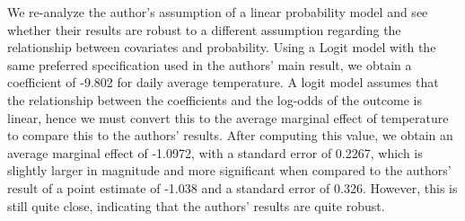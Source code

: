 \documentclass{article}
\begin{document}
	We re-analyze the author's assumption of a linear probability model and see whether their results are robust to a different assumption regarding the relationship between covariates and probability. Using a Logit model with the same preferred specification used in the authors' main result, we obtain a coefficient of -9.802 for daily average temperature. A logit model assumes that the relationship between the coefficients and the log-odds of the outcome is linear, hence we must convert this to the average marginal effect of temperature to compare this to the authors' results. After computing this value, we obtain an average marginal effect of -1.0972, with a standard error of 0.2267, which is slightly larger in magnitude and more significant when compared to the authors' result of a point estimate of -1.038 and a standard error of 0.326. However, this is still quite close, indicating that the authors' results are quite robust.
	
	


%



	
\end{document}
